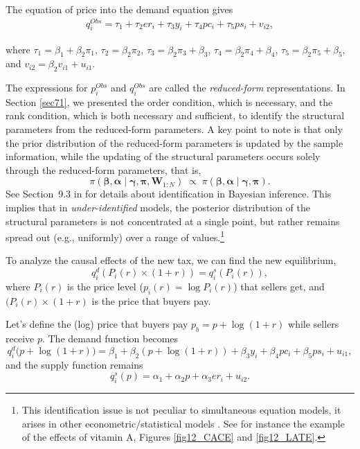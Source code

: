 The equation of price into the demand equation gives
\begin{align*}
	q_i^{Obs}=\tau_1+\tau_2 er_i + \tau_3 y_i + \tau_4 pc_i + \tau_5 ps_i + v_{i2},
\end{align*}

where $\tau_1=\beta_1+\beta_2\pi_1$, $\tau_2=\beta_2\pi_2$, $\tau_3=\beta_2\pi_3+\beta_3$, $\tau_4=\beta_2\pi_4+\beta_4$, $\tau_5=\beta_2\pi_5+\beta_5$, and $v_{i2}=\beta_2v_{i1}+u_{i1}$.

The expressions for $p_i^{Obs}$ and $q_i^{Obs}$ are called the \textit{reduced-form} representations. In Section \ref{sec71}, we presented the order condition, which is necessary, and the rank condition, which is both necessary and sufficient, to identify the structural parameters from the reduced-form parameters. A key point to note is that only the prior distribution of the reduced-form parameters is updated by the sample information, while the updating of the structural parameters occurs solely through the reduced-form parameters, that is,
\[
\pi(\boldsymbol{\beta},\boldsymbol{\alpha}\mid \boldsymbol{\gamma},\boldsymbol{\pi},\mathbf{W}_{1:N})
\;\propto\;
\pi(\boldsymbol{\beta},\boldsymbol{\alpha}\mid \boldsymbol{\gamma},\boldsymbol{\pi}).
\]
See Section~9.3 in \cite{zellner1996introduction} for details about identification in Bayesian inference. This implies that in \textit{under-identified} models, the posterior distribution of the structural parameters is not concentrated at a single point, but rather remains spread out (e.g., uniformly) over a range of values.\footnote{This identification issue is not peculiar to simultaneous equation models, it arises in other econometric/statistical models \cite{zellner1996introduction}. See for instance the example of the effects of vitamin A, Figures \ref{fig12_CACE} and \ref{fig12_LATE}.}

To analyze the causal effects of the new tax, we can find the new equilibrium,
\[
q_i^d(P_i(r)\times (1+r))=q_i^s(P_i(r)),
\] 
where $P_i(r)$ is the price level ($p_i(r)=\log P_i(r)$) that sellers get, and $(P_i(r)\times (1+r)$ is the price that buyers pay.

Let's define the (log) price that buyers pay $p_b = p + \log(1+r)$ while sellers receive $p$. The demand function becomes
\[
q_i^d\big(p + \log(1+r)\big) = \beta_1 + \beta_2\left(p + \log(1+r)\right) + \beta_3 y_i + \beta_4 pc_i + \beta_5 ps_i + u_{i1},
\]
and the supply function remains
\[
q_i^s(p) = \alpha_1 + \alpha_2 p + \alpha_3 er_i + u_{i2}.
\]

